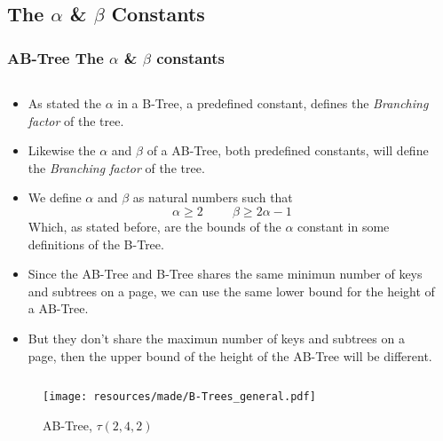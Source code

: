 \begin{frame}
    \subsection[The Alpha and Beta Constant]{The \texorpdfstring{\(\alpha\)}{alpha} \& \texorpdfstring{\(\beta\)}{beta} Constants}
    \frametitle{AB-Tree The \(\alpha\) \& \(\beta\) constants}
    \begin{columns}
        \begin{column}{\textlecolumn}
            \begin{block}{}
                \begin{itemize}
                    \item As stated the \(\alpha\) in a B-Tree, a predefined constant, defines the \emph{Branching factor} of the tree.
                    \item Likewise the \(\alpha\) and \(\beta\) of a AB-Tree, both predefined constants, will define the \emph{Branching factor} of the tree.
                    \item We define \(\alpha\) and \(\beta\) as natural numbers such that
                        \[
                            \alpha \geq 2 
                            \hspace{1cm}
                            \beta \geq 2 \alpha - 1
                        \]
                    Which, as stated before, are the bounds of the \(\alpha\) constant in some definitions of the B-Tree.
                    \item Since the AB-Tree and B-Tree shares the same minimun number of keys and subtrees on a page, 
                        we can use the same lower bound for the height of a AB-Tree.
                    \item But they don't share the maximun number of keys and subtrees on a page, then the upper bound of the height of the AB-Tree will be different.
                \end{itemize}
            \end{block}
        \end{column}
        \begin{column}{\textricolumn}
        \end{column}
    \end{columns}
    \framebreak{}
    \begin{figure}
        \centering
        \texttt{[image: resources/made/B-Trees\_general.pdf]}
        \caption[]{AB-Tree, \(\tau \left(2, 4, 2\right)\)}
    \end{figure}
\end{frame}
